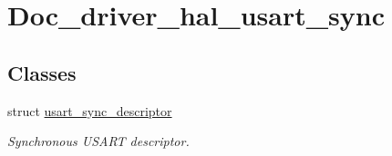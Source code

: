 \hypertarget{group__doc__driver__hal__usart__sync}{}\section{Doc\+\_\+driver\+\_\+hal\+\_\+usart\+\_\+sync}
\label{group__doc__driver__hal__usart__sync}
\subsection*{Classes}
\begin{DoxyCompactItemize}
\item 
struct \hyperlink{structusart__sync__descriptor}{usart\+\_\+sync\+\_\+descriptor}
\begin{DoxyCompactList}\small\item\em Synchronous U\+S\+A\+RT descriptor. \end{DoxyCompactList}\end{DoxyCompactItemize}
